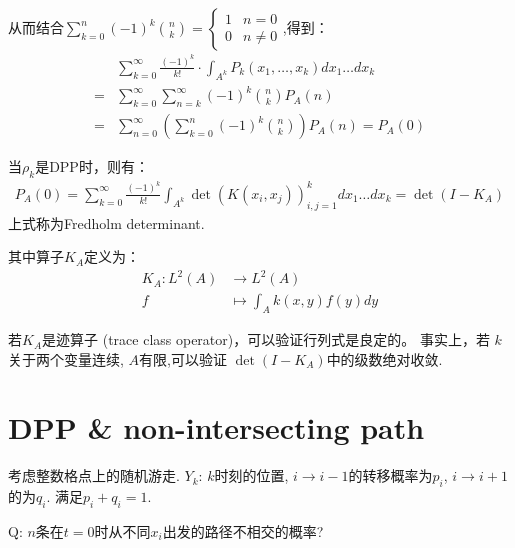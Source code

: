 从而结合$\sum\limits_{k=0}^{n}(-1)^{k}\binom{n}{k}=\begin{cases} 1 & n=0 \\ 0 & n \neq 0 \end{cases}$,得到：
\begin{equation*}
    \begin{aligned}
        &\sum_{k=0}^{\infty}\frac{(-1)^{k}}{k!}\cdot\int_{A^{k}}P_{k}(x_{1},\dots,x_{k})dx_{1} \dots dx_{k}\\
        =&\sum_{k=0}^{\infty}\sum_{n=k}^{\infty}(-1)^{k}\binom{n}{k}P_{A}(n)\\
        =&\sum_{n=0}^{\infty}\left(\sum_{k=0}^{n}(-1)^{k}\binom{n}{k}\right)P_{A}(n)=P_A(0)
    \end{aligned}
\end{equation*}

当$\rho_k$是DPP时，则有：
\begin{equation*}
    \begin{aligned}
         P_{A}(0)=\sum_{k=0}^{\infty}\frac{(-1)^{k}}{k!}\int_{A^{k}} \det(K(x_{i},x_{j}))_{i,j=1}^{k}dx_{1} \dots dx_{k}=\det(I-K_{A})
    \end{aligned}
\end{equation*}
上式称为Fredholm determinant.

其中算子$K_A$定义为：
\begin{equation*}
    \begin{aligned}
        K_{A}:L^{2}(A)&\rightarrow L^{2}(A)\\
        f&\mapsto\int_{A}k(x,y)f(y)dy
    \end{aligned}
\end{equation*}

若$K_A$是迹算子 (trace class operator)，可以验证行列式是良定的。
事实上，若 $k$关于两个变量连续, $A$有限,可以验证 $\det(I-K_A)$中的级数绝对收敛.

\section{ DPP \& non-intersecting path}

考虑整数格点上的随机游走.
$Y_k$: $k$时刻的位置,
$i\rightarrow i-1$的转移概率为$p_i$, $i\rightarrow i+1$的为$q_i$.
满足$p_i + q_i = 1$.

Q: $n$条在$t=0$时从不同$x_i$出发的路径不相交的概率?


